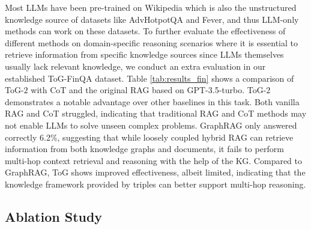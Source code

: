 \documentclass{article} %
\begin{document}
Most LLMs have been pre-trained on Wikipedia which is also the unstructured knowledge source of datasets like AdvHotpotQA and Fever, and thus LLM-only methods can work on these datasets. To further evaluate the effectiveness of different methods on domain-specific reasoning scenarios where it is essential to retrieve information from specific knowledge sources since LLMs themselves usually lack relevant knowledge, we conduct an extra evaluation in our established ToG-FinQA dataset. Table \ref{tab:results_fin} shows a comparison of ToG-$2$ with CoT and the original RAG based on GPT-3.5-turbo.
ToG-$2$ demonstrates a notable advantage over other baselines in this task. Both vanilla RAG and CoT struggled, indicating that traditional RAG and CoT methods may not enable LLMs to solve unseen complex problems. GraphRAG only answered correctly 6.2\%, suggesting that while loosely coupled hybrid RAG can retrieve information from both knowledge graphs and documents, it fails to perform multi-hop context retrieval and reasoning with the help of the KG. Compared to GraphRAG, ToG shows improved effectiveness, albeit limited, indicating that the knowledge framework provided by triples can better support multi-hop reasoning.
\subsection{Ablation Study}
\end{document}
